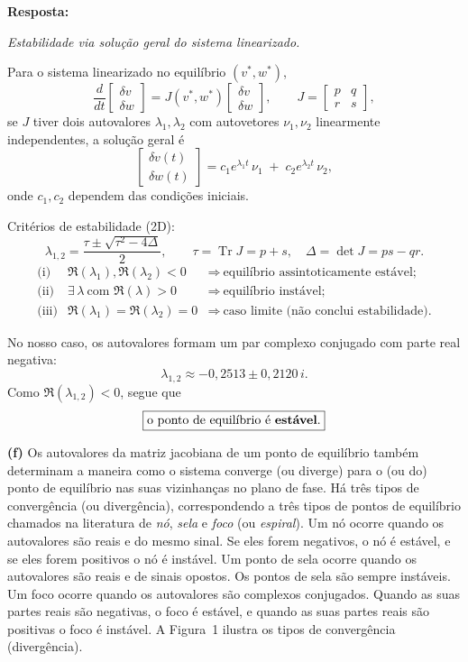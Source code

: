 \documentclass[english,11pt,a4paper]{article}
\begin{document}
	\noindent\textbf{Resposta:}
	
	\noindent\textit{Estabilidade via solução geral do sistema linearizado.}
	
	\noindent Para o sistema linearizado no equilíbrio \((v^\ast,w^\ast)\),
	\[
	\frac{d}{dt}\begin{bmatrix}\delta v\\ \delta w\end{bmatrix}
	= J(v^\ast,w^\ast)\begin{bmatrix}\delta v\\ \delta w\end{bmatrix},
	\qquad
	J=\begin{bmatrix}p & q\\ r & s\end{bmatrix},
	\]
	se \(J\) tiver dois autovalores \(\lambda_1,\lambda_2\) com autovetores \(\nu_1,\nu_2\) linearmente independentes, a solução geral é
	\[
	\begin{bmatrix}\delta v(t)\\ \delta w(t)\end{bmatrix}
	= c_1 e^{\lambda_1 t}\,\nu_1 \;+\; c_2 e^{\lambda_2 t}\,\nu_2,
	\]
	onde \(c_1,c_2\) dependem das condições iniciais.
	
	\medskip
	\noindent Critérios de estabilidade (2D):
	\[
	\lambda_{1,2}=\frac{\tau\pm\sqrt{\tau^2-4\Delta}}{2}, 
	\qquad \tau=\operatorname{Tr}J=p+s,\quad \Delta=\det J=ps-qr.
	\]
	\[
	\begin{array}{lcl}
		\text{(i)} & \Re(\lambda_1),\Re(\lambda_2)<0 &\Rightarrow\ \text{equilíbrio assintoticamente estável;}\\
		\text{(ii)} & \exists\,\lambda\ \text{com }\Re(\lambda)>0 &\Rightarrow\ \text{equilíbrio instável;}\\
		\text{(iii)} & \Re(\lambda_1)=\Re(\lambda_2)=0 &\Rightarrow\ \text{caso limite (não conclui estabilidade).}
	\end{array}
	\]
	
	\medskip
	\noindent No nosso caso, os autovalores formam um par complexo conjugado com parte real negativa:
	\[
	\lambda_{1,2}\approx -0{,}2513 \pm 0{,}2120\,i.
	\]
	Como \(\Re(\lambda_{1,2})<0\), segue que
	\[
	\boxed{\text{o ponto de equilíbrio é \textbf{estável}.}}
	\]
	
	
	
	\noindent\textbf{(f)} Os autovalores da matriz jacobiana de um ponto de equilíbrio também determinam a maneira como o sistema converge (ou diverge) para o (ou do) ponto de equilíbrio nas suas vizinhanças no plano de fase. Há três tipos de convergência (ou divergência), correspondendo a três tipos de pontos de equilíbrio chamados na literatura de \textit{nó}, \textit{sela} e \textit{foco} (ou \textit{espiral}). Um nó ocorre quando os autovalores são reais e do mesmo sinal. Se eles forem negativos, o nó é estável, e se eles forem positivos o nó é instável. Um ponto de sela ocorre quando os autovalores são reais e de sinais opostos. Os pontos de sela são sempre instáveis. Um foco ocorre quando os autovalores são complexos conjugados. Quando as suas partes reais são negativas, o foco é estável, e quando as suas partes reais são positivas o foco é instável. A Figura~1 ilustra os tipos de convergência (divergência).
	
\end{document}
